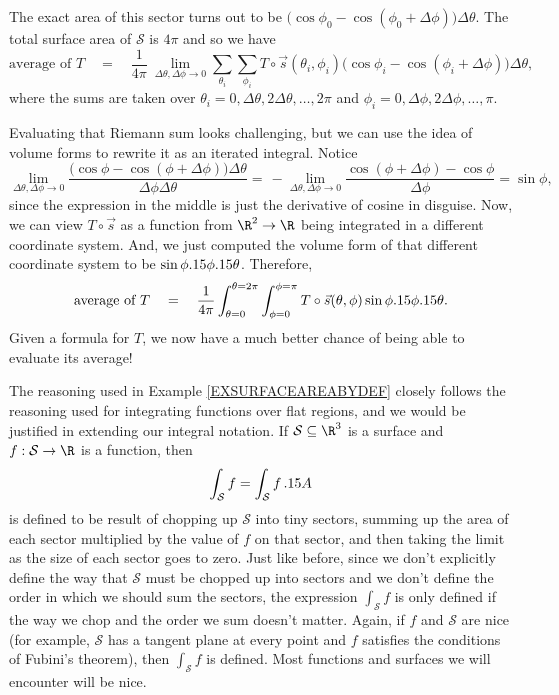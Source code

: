 \begin{example}
\begin{center}
\begin{tikzpicture}[>=latex]
\end{tikzpicture}
	\end{center}

	The exact area of this sector turns out to be $\big(\cos\phi_0-\cos(\phi_0+\Delta\phi)\big)\Delta\theta$.
	The total surface area of $\mathcal S$ is $4\pi$ and so we have
	\[
		\text{average of }T\quad=\quad \frac{1}{4\pi}\  \lim_{\Delta\theta,\Delta\phi\to0}
		\sum_{\theta_i}\sum_{\phi_i} T\circ \vec s(\theta_i,\phi_i)\Big(\cos\phi_i-\cos(\phi_i+\Delta\phi)\Big)\Delta\theta,
	\]
	where the sums are taken over $\theta_i=0,\Delta\theta,2\Delta\theta,\ldots,2\pi$ and
	$\phi_i=0,\Delta\phi,2\Delta\phi,\ldots,\pi$.

	Evaluating that Riemann sum looks challenging, but we can use the idea of volume
	forms to rewrite it as an iterated integral.  Notice
	\[
		\lim_{\Delta\theta,\Delta\phi\to0} \frac{\big(\cos\phi-\cos(\phi+\Delta\phi)\big)\Delta \theta}
		{\Delta \phi\Delta\theta}
		=\,-\lim_{\Delta\theta,\Delta\phi\to0} \frac{\cos(\phi+\Delta\phi)-\cos\phi}
		{\Delta \phi} = \sin\phi,
	\]
	since the expression in the middle is just the derivative of cosine in disguise.  Now,
	we can view $T\circ \vec s$ as a function from $\R^2\to\R$ being integrated in a different
	coordinate system.  And, we just computed the volume form of that different coordinate
	system to be $\sin\phi\d\phi\d\theta$.  Therefore,
	\[
		\text{average of }T\quad=\quad\frac{1}{4\pi}\int_{\theta=0}^{\theta=2\pi}\int_{\phi=0}^{\phi=\pi}
		T\circ \vec s(\theta,\phi)\sin\phi\d\phi\d\theta.
	\]
	Given a formula for $T$, we now have a much better chance of being able to evaluate its average!
\end{example}

The reasoning used in Example \ref{EXSURFACEAREABYDEF} closely follows the reasoning
used for integrating functions over flat regions, and we would be justified in extending our integral
notation.  If $\mathcal S\subseteq\R^3$ is a surface and $f:\mathcal S\to\R$ is a function,
then
\[
	\int_{\mathcal S} f  = \int_{\mathcal S} f\,\d A
\]
is defined to be result of chopping up $\mathcal S$ into tiny sectors, summing up the
area of each sector multiplied by the value of $f$ on that sector, and then taking the limit as
the size of each sector goes to zero.  Just like before, since we don't explicitly define the way
that $\mathcal S$ must be chopped up into sectors and we don't define the order in which we
should sum the sectors, the expression $\int_{\mathcal S}f$ is only defined if the way we chop
and the order we sum doesn't matter.  Again, if $f$ and $\mathcal S$ are nice (for example, $\mathcal S$
has a tangent plane at every point and $f$ satisfies the conditions of Fubini's theorem), then
$\int_{\mathcal S} f$ is defined.  Most functions and surfaces we will encounter will be nice.

